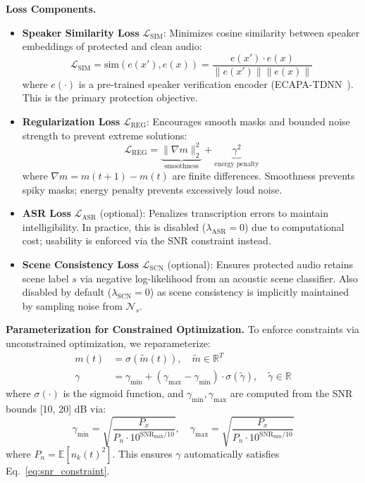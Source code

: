 \textbf{Loss Components.}
\begin{itemize}[leftmargin=*,nosep]
    \item \textbf{Speaker Similarity Loss} $\mathcal{L}_{\text{SIM}}$: Minimizes cosine similarity between speaker embeddings of protected and clean audio:
    \begin{equation}
    \mathcal{L}_{\text{SIM}} = \text{sim}(e(x'), e(x)) = \frac{e(x') \cdot e(x)}{\|e(x')\| \|e(x)\|}
    \end{equation}
    where $e(\cdot)$ is a pre-trained speaker verification encoder (ECAPA-TDNN~\citep{ecapa}). This is the primary protection objective.
    
    \item \textbf{Regularization Loss} $\mathcal{L}_{\text{REG}}$: Encourages smooth masks and bounded noise strength to prevent extreme solutions:
    \begin{equation}
    \mathcal{L}_{\text{REG}} = \underbrace{\| \nabla m \|_2^2}_{\text{smoothness}} + \underbrace{\gamma^2}_{\text{energy penalty}}
    \end{equation}
    where $\nabla m = m(t+1) - m(t)$ are finite differences. Smoothness prevents spiky masks; energy penalty prevents excessively loud noise.
    
    \item \textbf{ASR Loss} $\mathcal{L}_{\text{ASR}}$ (optional): Penalizes transcription errors to maintain intelligibility. In practice, this is disabled ($\lambda_{\text{ASR}} = 0$) due to computational cost; usability is enforced via the SNR constraint instead.
    
    \item \textbf{Scene Consistency Loss} $\mathcal{L}_{\text{SCN}}$ (optional): Ensures protected audio retains scene label $s$ via negative log-likelihood from an acoustic scene classifier. Also disabled by default ($\lambda_{\text{SCN}} = 0$) as scene consistency is implicitly maintained by sampling noise from $\mathcal{N}_s$.
\end{itemize}

\textbf{Parameterization for Constrained Optimization.}
To enforce constraints via unconstrained optimization, we reparameterize:
\begin{equation}
\begin{aligned}
m(t) &= \sigma(\tilde{m}(t)), \quad \tilde{m} \in \mathbb{R}^T \\
\gamma &= \gamma_{\min} + (\gamma_{\max} - \gamma_{\min}) \cdot \sigma(\tilde{\gamma}), \quad \tilde{\gamma} \in \mathbb{R}
\end{aligned}
\end{equation}
where $\sigma(\cdot)$ is the sigmoid function, and $\gamma_{\min}, \gamma_{\max}$ are computed from the SNR bounds [10, 20] dB via:
\begin{equation}
\gamma_{\min} = \sqrt{\frac{P_x}{P_n \cdot 10^{\text{SNR}_{\max}/10}}}, \quad \gamma_{\max} = \sqrt{\frac{P_x}{P_n \cdot 10^{\text{SNR}_{\min}/10}}}
\end{equation}
where $P_n = \mathbb{E}[n_k(t)^2]$. This ensures $\gamma$ automatically satisfies Eq.~\eqref{eq:snr_constraint}.


